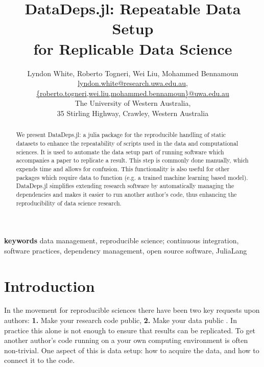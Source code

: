 \documentclass[dvinames]{josr}
\begin{document}
\title{DataDeps.jl: Repeatable Data Setup \\ for Replicable Data Science}
\author{Lyndon White, %
	Roberto Togneri, %
	Wei Liu, %
	Mohammed Bennamoun%
	\\ 
	\url{lyndon.white@research.uwa.edu.au}, \\%
	\url{{roberto.togneri,wei.liu,mohammed.bennamoun}@uwa.edu.au}\\
	The University of Western Australia,\\
	35 Stirling Highway, Crawley, Western Australia
}


\maketitle

\begin{abstract}
	We present DataDeps.jl: a julia package for the reproducible handling of static datasets to enhance the repeatability of scripts used in the data and computational sciences.
	It is used to automate the data setup part of running software which accompanies a paper to replicate a result.
	This step is commonly done manually, which expends time and allows for confusion.
	This functionality is also useful for other packages which require data to function (e.g. a trained machine learning based model).
	DataDeps.jl simplifies extending research software by automatically managing the dependencies and makes it easier to run another author's code, thus enhancing the reproducibility of data science research.
\end{abstract}

\textbf{keywords}
data management,  reproducible science; continuous integration, software practices, dependency management, open source software, \mbox{JuliaLang}


\section{Introduction}

In the movement for reproducible sciences there have been two key requests upon authors:
\textbf{1.} Make your research code public, \textbf{2.} Make your data public \citep{lookafterdata}.
In practice this alone is not enough to ensure that results can be replicated.
To get another author's code running on a your own computing environment is often non-trivial.
One aspect of this is data setup: how to acquire the data, and how to connect it to the code.
\end{document}
